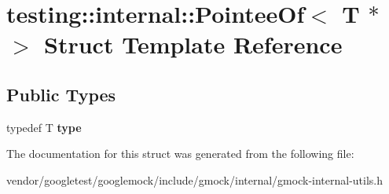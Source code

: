 \hypertarget{structtesting_1_1internal_1_1_pointee_of_3_01_t_01_5_01_4}{}\section{testing\+:\+:internal\+:\+:Pointee\+Of$<$ T $\ast$ $>$ Struct Template Reference}
\label{structtesting_1_1internal_1_1_pointee_of_3_01_t_01_5_01_4}
\subsection*{Public Types}
\begin{DoxyCompactItemize}
\item 
\mbox{\label{structtesting_1_1internal_1_1_pointee_of_3_01_t_01_5_01_4_a91dde514cd3a8c07cedbe5336c36a55f}} 
typedef T {\bfseries type}
\end{DoxyCompactItemize}


The documentation for this struct was generated from the following file\+:\begin{DoxyCompactItemize}
\item 
vendor/googletest/googlemock/include/gmock/internal/gmock-\/internal-\/utils.\+h\end{DoxyCompactItemize}
